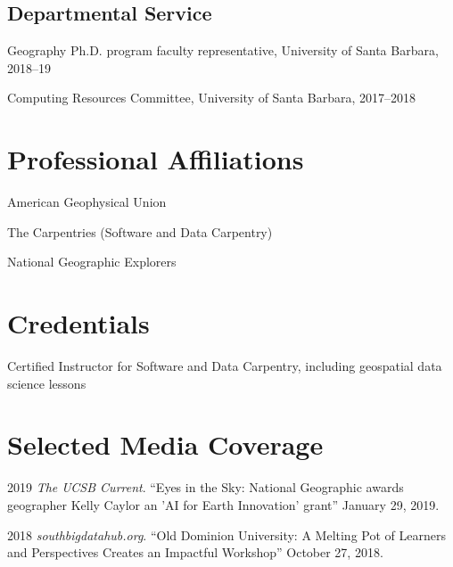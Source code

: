 \documentclass[12pt,letterpaper]{report}
\newcommand{\listitemspace}{0.15em}
\renewenvironment{itemize}
{\begin{list}{}{\setlength{\leftmargin}{0em}
			\setlength{\parskip}{0em}
			\setlength{\itemsep}{\listitemspace}
			\setlength{\parsep}{\listitemspace}}}
	{\end{list}}
\begin{document}
	\subsection*{Departmental Service}
	
	\begin{itemize}
		
        \item Geography Ph.D. program faculty representative, University of Santa Barbara, 2018--19

		\item Computing Resources Committee, University of Santa Barbara, 2017--2018
		
	\end{itemize}
	
	
	
	\section*{Professional Affiliations}
	
	\begin{itemize}
		
		\item American Geophysical Union
		
		\item The Carpentries (Software and Data Carpentry)

                \item National Geographic Explorers
		
	\end{itemize}
	
	
	
	\section*{Credentials}
	
	\begin{itemize}
		
		\item Certified Instructor for Software and Data Carpentry, including geospatial data science lessons
		
	\end{itemize}
		
	
	
	\section*{Selected Media Coverage}
	
	\begin{tablist}
		
		\item 2019 \tab \textit{The UCSB Current}. \enquote{Eyes in the Sky: National Geographic awards geographer Kelly Caylor an 'AI for Earth Innovation' grant} January 29, 2019.
		
		\item 2018 \tab \textit{southbigdatahub.org}. \enquote{Old Dominion University: A Melting Pot of Learners and Perspectives Creates an Impactful Workshop} October 27, 2018.
				
	\end{tablist}
	
\end{document}

